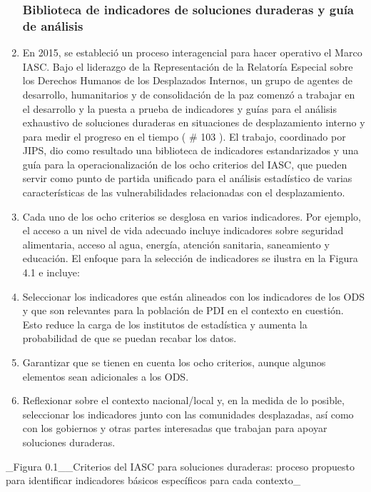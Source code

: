 \documentclass[
]{book}
\begin{document}
\begin{enumerate}
{  \subsubsection{Biblioteca de indicadores de soluciones duraderas y guía de análisis}\label{biblioteca-de-indicadores-de-soluciones-duraderas-y-guuxeda-de-anuxe1lisis}}
\item
  En 2015, se estableció un proceso interagencial para hacer operativo el Marco IASC. Bajo el liderazgo de la Representación de la Relatoría Especial sobre los Derechos Humanos de los Desplazados Internos, un grupo de agentes de desarrollo, humanitarios y de consolidación de la paz comenzó a trabajar en el desarrollo y la puesta a prueba de indicadores y guías para el análisis exhaustivo de soluciones duraderas en situaciones de desplazamiento interno y para medir el progreso en el tiempo (
  \# 103
  ). El trabajo, coordinado por JIPS, dio como resultado una biblioteca de indicadores estandarizados y una guía para la operacionalización de los ocho criterios del IASC, que pueden servir como punto de partida unificado para el análisis estadístico de varias características de las vulnerabilidades relacionadas con el desplazamiento.
\item
  Cada uno de los ocho criterios se desglosa en varios indicadores. Por ejemplo, el acceso a un nivel de vida adecuado incluye indicadores sobre seguridad alimentaria, acceso al agua, energía, atención sanitaria, saneamiento y educación. El enfoque para la selección de indicadores se ilustra en la Figura 4.1 e incluye:
\item
  Seleccionar los indicadores que están alineados con los indicadores de los ODS y que son relevantes para la población de PDI en el contexto en cuestión. Esto reduce la carga de los institutos de estadística y aumenta la probabilidad de que se puedan recabar los datos.
\item
  Garantizar que se tienen en cuenta los ocho criterios, aunque algunos elementos sean adicionales a los ODS.
\item
  Reflexionar sobre el contexto nacional/local y, en la medida de lo posible, seleccionar los indicadores junto con las comunidades desplazadas, así como con los gobiernos y otras partes interesadas que trabajan para apoyar soluciones duraderas.
\end{enumerate}

\_Figura 0.1\_\_Criterios del IASC para soluciones duraderas: proceso propuesto para identificar indicadores básicos específicos para cada contexto\_
\end{document}
